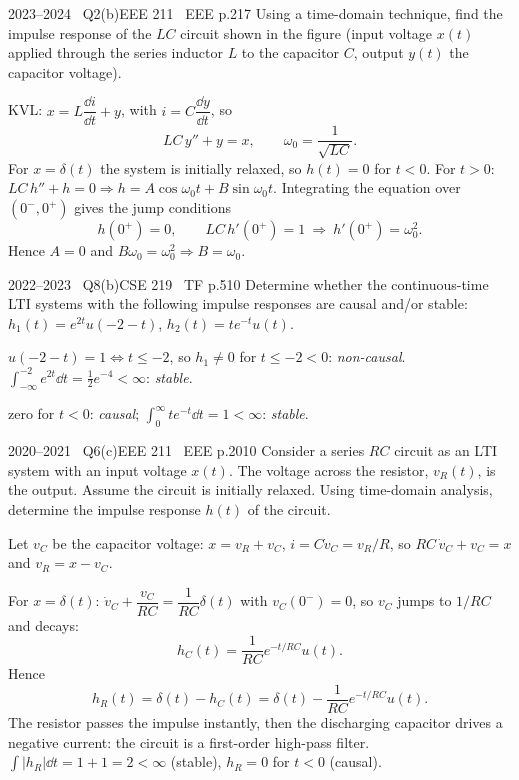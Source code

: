 \begin{qcard}{2023--2024 \textbullet\ Q2(b)}{EEE 211 \textbullet\ EEE p.2}{17}
Using a time-domain technique, find the impulse response of the $LC$ circuit shown in the figure (input voltage $x(t)$ applied through the series inductor $L$ to the capacitor $C$, output $y(t)$ the capacitor voltage).
\end{qcard}
\begin{solution}
KVL: $x=L\dfrac{\dd i}{\dd t}+y$, with $i=C\dfrac{\dd y}{\dd t}$, so
\[LC\,y''+y=x,\qquad \omega_0=\frac1{\sqrt{LC}}.\]
For $x=\delta(t)$ the system is initially relaxed, so $h(t)=0$ for $t<0$. For $t>0$: $LC\,h''+h=0\Rightarrow h=A\cos\omega_0t+B\sin\omega_0t$. Integrating the equation over $(0^-,0^+)$ gives the jump conditions
\[h(0^+)=0,\qquad LC\,h'(0^+)=1\ \Rightarrow\ h'(0^+)=\omega_0^2 .\]
Hence $A=0$ and $B\omega_0=\omega_0^2\Rightarrow B=\omega_0$.
\end{solution}

\begin{qcard}{2022--2023 \textbullet\ Q8(b)}{CSE 219 \textbullet\ TF p.5}{10}
Determine whether the continuous-time LTI systems with the following impulse responses are causal and/or stable: $h_1(t)=e^{2t}u(-2-t)$, \quad $h_2(t)=te^{-t}u(t)$.
\end{qcard}
\begin{solution}
 $u(-2-t)=1\Leftrightarrow t\le-2$, so $h_1\ne0$ for $t\le-2<0$: \emph{non-causal}. $\int_{-\infty}^{-2}e^{2t}\dd t=\tfrac12e^{-4}<\infty$: \emph{stable}.

 zero for $t<0$: \emph{causal}; $\int_0^\infty te^{-t}\dd t=1<\infty$: \emph{stable}.
\end{solution}

\begin{qcard}{2020--2021 \textbullet\ Q6(c)}{EEE 211 \textbullet\ EEE p.20}{10}
Consider a series $RC$ circuit as an LTI system with an input voltage $x(t)$. The voltage across the resistor, $v_R(t)$, is the output. Assume the circuit is initially relaxed. Using time-domain analysis, determine the impulse response $h(t)$ of the circuit.
\end{qcard}
\begin{solution}
Let $v_C$ be the capacitor voltage: $x=v_R+v_C$, $i=C\dot v_C=v_R/R$, so $RC\,\dot v_C+v_C=x$ and $v_R=x-v_C$.

For $x=\delta(t)$: $\dot v_C+\dfrac{v_C}{RC}=\dfrac1{RC}\delta(t)$ with $v_C(0^-)=0$, so $v_C$ jumps to $1/RC$ and decays:
\[h_C(t)=\frac1{RC}e^{-t/RC}u(t).\]
Hence
\[h_R(t)=\delta(t)-h_C(t)=\delta(t)-\frac1{RC}e^{-t/RC}u(t).\]
The resistor passes the impulse instantly, then the discharging capacitor drives a negative current: the circuit is a first-order high-pass filter. $\int|h_R|\dd t=1+1=2<\infty$ (stable), $h_R=0$ for $t<0$ (causal).
\end{solution}
